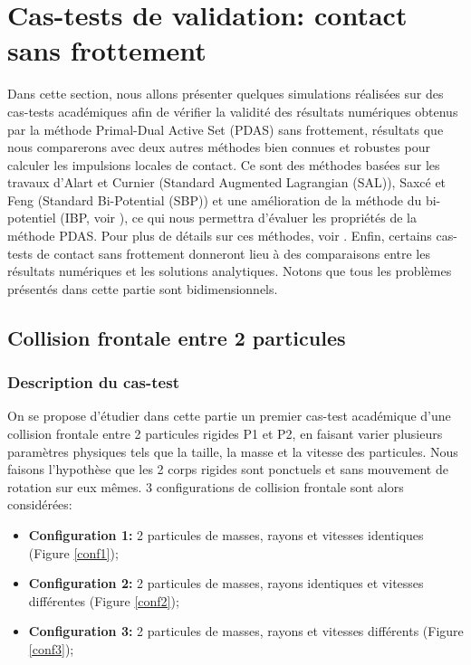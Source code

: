 \newpage

\section{Cas-tests de validation: contact sans frottement}\label{frictionless_test_cases}

Dans cette section, nous allons présenter quelques simulations réalisées sur des cas-tests académiques afin de vérifier la validité des résultats numériques obtenus par la méthode Primal-Dual Active Set (PDAS) sans frottement, résultats que nous comparerons avec deux autres méthodes bien connues et robustes pour calculer les impulsions locales de contact. Ce sont des méthodes basées sur les travaux d'Alart et Curnier (Standard Augmented Lagrangian (SAL)), Saxcé et Feng (Standard Bi-Potential (SBP)) et une amélioration de la méthode du bi-potentiel (IBP, voir \cite{feng2005bi}), ce qui nous permettra d'évaluer les propriétés de la méthode PDAS. Pour plus de détails sur ces méthodes, voir \cite{dumont2013enhanced}. Enfin, certains cas-tests de contact sans frottement donneront lieu à des comparaisons entre les résultats numériques et les solutions analytiques. Notons que tous les problèmes présentés dans cette partie sont bidimensionnels.

\subsection{Collision frontale entre 2 particules}
\subsubsection{Description du cas-test}

On se propose d'étudier dans cette partie un premier cas-test académique d'une collision frontale entre 2 particules rigides P1 et P2, en faisant varier plusieurs paramètres physiques tels que la taille, la masse et la vitesse des particules. Nous faisons l'hypothèse que les 2 corps rigides sont ponctuels et sans mouvement de rotation sur eux mêmes. 3 configurations de collision frontale sont alors considérées:

\begin{itemize}
    \item \textbf{Configuration 1:} 2 particules de masses, rayons et vitesses identiques (Figure \ref{conf1});
    \item \textbf{Configuration 2:} 2 particules de masses, rayons identiques et vitesses différentes (Figure \ref{conf2});
    \item \textbf{Configuration 3:} 2 particules de masses, rayons et vitesses différents (Figure \ref{conf3});
\end{itemize}

